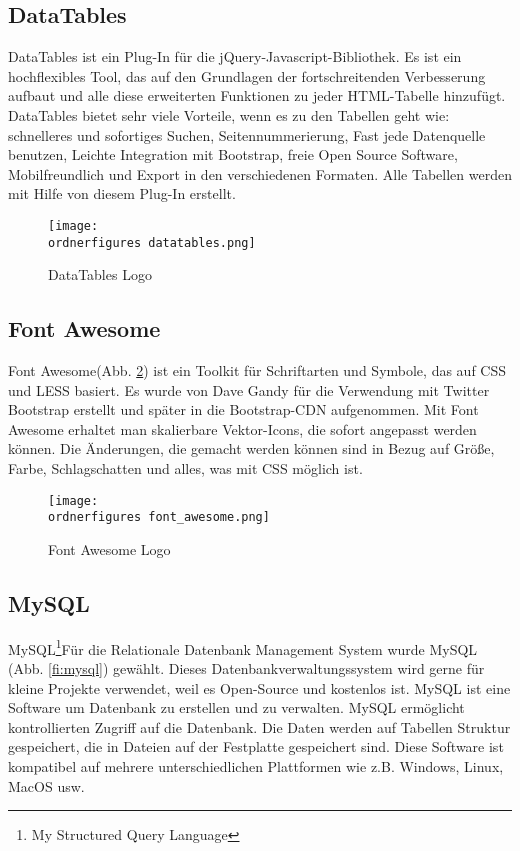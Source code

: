\subsection{DataTables}

DataTables ist ein Plug-In f\"{u}r die jQuery-Javascript-Bibliothek. Es ist ein hochflexibles Tool, das auf den Grundlagen der fortschreitenden Verbesserung aufbaut und alle diese erweiterten Funktionen zu jeder HTML-Tabelle hinzuf\"{u}gt. DataTables bietet sehr viele Vorteile, wenn es zu den Tabellen geht wie: schnelleres und sofortiges Suchen, Seitennummerierung, Fast jede Datenquelle benutzen, Leichte Integration mit Bootstrap, freie Open Source Software, Mobilfreundlich und Export in den verschiedenen Formaten. Alle Tabellen werden mit Hilfe von diesem Plug-In erstellt.\cite{40_datatables}

\begin{figure}[H]
	\centering
	\texttt{[image: \\ordnerfigures datatables.png]}
	\caption{DataTables Logo\cite{40_datatables_img}}
	\label{fi:datatables}
\end{figure}


\subsection{Font Awesome}
Font Awesome(Abb. \ref{fi:fontawesome}) ist ein Toolkit für Schriftarten und Symbole, das auf CSS und LESS basiert. Es wurde von Dave Gandy für die Verwendung mit Twitter Bootstrap erstellt und später in die Bootstrap-CDN aufgenommen. Mit Font Awesome erhaltet man skalierbare Vektor-Icons, die sofort angepasst werden können. Die Änderungen, die gemacht werden können sind in Bezug auf Größe, Farbe, Schlagschatten und alles, was mit CSS möglich ist.

\begin{figure}[H]
	\centering
	\texttt{[image: \\ordnerfigures font\_awesome.png]}
	\caption{Font Awesome Logo\cite{40_font_awesome_img}}
	\label{fi:fontawesome}
\end{figure}


\subsection{MySQL}

MySQL\footnote{My Structured Query Language}F\"{u}r die Relationale Datenbank Management System wurde MySQL (Abb. \ref{fi:mysql}) gew\"{a}hlt. Dieses Datenbankverwaltungssystem wird gerne f\"{u}r kleine Projekte verwendet, weil es Open-Source und kostenlos ist. MySQL ist eine Software um Datenbank zu erstellen und zu verwalten. MySQL erm\"{o}glicht kontrollierten Zugriff auf die Datenbank. Die Daten werden auf Tabellen Struktur gespeichert, die in Dateien auf der Festplatte gespeichert sind. Diese Software ist kompatibel auf mehrere unterschiedlichen Plattformen wie z.B. Windows, Linux, MacOS usw.


